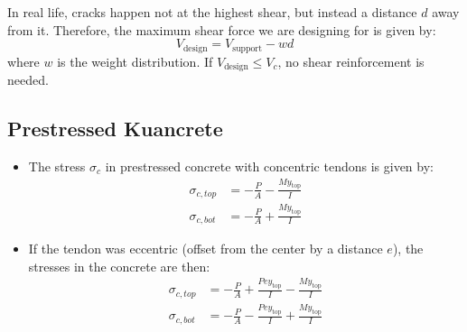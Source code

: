 \documentclass{article}
\begin{document}
\begin{itemize}
\begin{itemize}
    \end{itemize}
    \begin{idea}
        In real life, cracks happen not at the highest shear, but instead a distance $d$ away from it. Therefore, the maximum shear force we are designing for is given by:
        \begin{equation}
            V_\text{design} = V_\text{support} - wd
            \label{eq:}
        \end{equation}
        where $w$ is the weight distribution. If $V_\text{design} \le V_c$, no shear reinforcement is needed.
    \end{idea}
\end{itemize}
\subsection{Prestressed Kuancrete}
\begin{itemize}
    \item The stress $\sigma_c$ in prestressed concrete with concentric tendons is given by:
    \begin{align}
        \sigma_{c,top} &= -\frac{P}{A}-\frac{My_\text{top}}{I} \\ 
        \sigma_{c,bot} &= -\frac{P}{A}+\frac{My_\text{top}}{I}
        \label{eq:}
    \end{align}
    \item If the tendon was eccentric (offset from the center by a distance $e$), the stresses in the concrete are then:
    \begin{align}
        \sigma_{c,top} &= -\frac{P}{A}+\frac{Pey_\text{top}}{I}-\frac{My_\text{top}}{I} \\ 
        \sigma_{c,bot} &= -\frac{P}{A}-\frac{Pey_\text{top}}{I}+\frac{My_\text{top}}{I}
        \label{eq:}
    \end{align}
\end{itemize}
\end{document}
